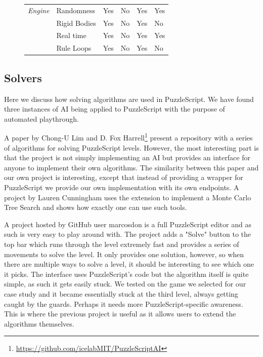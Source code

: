 \begin{figure}[!t]
\begin{tabular}{p{2cm}|p{3cm}|p{2cm}|p{2cm}|p{2cm}|p{2cm}}
    \textit{Engine}   & Randomness          & Yes                   & No                           & Yes                     & Yes                           \\
                      & Rigid Bodies        & Yes                   & No                           & Yes                     & No                            \\
                      & Real time           & Yes                   & No                           & Yes                     & Yes                           \\
                      & Rule Loops          & Yes                   & No                           & Yes                     & No                            \\
    \end{tabular}
    \label{fig:feature_comparison_rw}
\end{figure}

\subsection{Solvers}
Here we discuss how solving algorithms are used in PuzzleScript. We have found three instances of AI being applied to PuzzleScript with the purpose of automated playthrough.

A paper by Chong-U Lim and D. Fox Harrell\cite{6932896}\footnote{\url{https://github.com/icelabMIT/PuzzleScriptAI}} present a repository with a series of algorithms for solving PuzzleScript levels. However, the most interesting part is that the project is not simply implementing an AI but provides an interface for anyone to implement their own algorithms. The similarity between this paper and our own project is interesting, except that instead of providing a wrapper for PuzzleScript we provide our own implementation with its own endpoints. A project by Lauren Cunningham\cite{PuzzleScriptSolver} uses the extension to implement a Monte Carlo Tree Search and shows how exactly one can use such tools. 

A project hosted by GitHub user marcosdon\cite{PuzzleScriptWithSolver} is a full PuzzleScript editor and as such is very easy to play around with. The project adds a "Solve" button to the top bar which runs through the level extremely fast and provides a series of movements to solve the level. It only provides one solution, however, so when there are multiple ways to solve a level, it should be interesting to see which one it picks. The interface uses PuzzleScript's code but the algorithm itself is quite simple, as such it gets easily stuck. We tested on the game we selected for our case study and it became essentially stuck at the third level, always getting caught by the guards. Perhaps it needs more PuzzleScript-specific awareness. This is where the previous project is useful as it allows users to extend the algorithms themselves.



